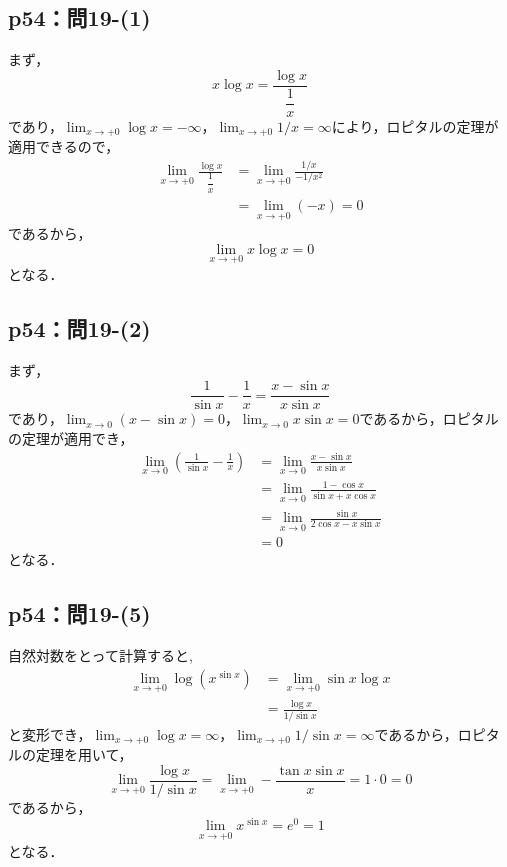 \documentclass[uplatex,dvipdfmx,a4paper,10pt,fleqn]{jsarticle}
\newenvironment{tleftbar}{\begin{tbleftline}\setlength{\parindent}{1zw}}{\end{tbleftline}}
\begin{document}
\newpage 


\subsection*{p54：問19-(1)}

\begin{tleftbar}
    まず，
    \[
        x \log x = \frac{\log x}{\dfrac{1}{x}}
    \]
    であり，$\lim_{x \to +0} \log x =-\infty$，$\lim_{x \to +0} 1/x= \infty$により，ロピタルの定理が適用できるので，
    \begin{align*} 
        \lim_{x \to +0}  \frac{\log x}{\dfrac{1}{x}} & = \lim_{x \to +0} \frac{1/x}{-1/x^2} \\
        & =\lim_{x \to +0} (-x)=0
    \end{align*}
    であるから，
    \[
        \lim_{x \to +0}   x \log x  =0
    \]
    となる．
\end{tleftbar}


\subsection*{p54：問19-(2)}

\begin{tleftbar}
    まず，
    \[
        \frac{1}{\sin x}-\frac{1}{x} = \frac{x-\sin x}{x \sin x}
    \]
    であり，$\lim_{x \to 0} (x-\sin x)=0$，$\lim_{x \to 0} x \sin x=0$であるから，ロピタルの定理が適用でき，
    \begin{align*} 
        \lim_{x \to 0} \left (\frac{1}{\sin x}-\frac{1}{x} \right ) & = \lim_{x \to 0}  \frac{x-\sin x}{x \sin x} \\
        & =  \lim_{x \to 0} \frac{1-\cos x}{\sin x + x \cos x} \\
        & = \lim_{x \to 0} \frac{\sin x}{2\cos x -x\sin x} \\
        & = 0
    \end{align*} 
    となる．
\end{tleftbar}

\subsection*{p54：問19-(5)}

\begin{tleftbar}
    自然対数をとって計算すると,
    \begin{align*} 
       \lim_{x \to +0} \log ( x^{\sin x}) & = \lim_{x \to +0} \sin x \log x \\
       & = \frac{\log x}{1/\sin x}
    \end{align*} 
    と変形でき，$\lim_{x \to +0} \log x = \infty$，$\lim_{x \to +0} 1/\sin x=\infty$であるから，ロピタルの定理を用いて，
    \[
        \lim_{x \to +0} \frac{\log x}{1/\sin x} = \lim_{x \to +0}  -\frac{\tan x \sin x }{x } = 1 \cdot 0=0
    \]
    であるから，
    \[
        \lim_{x \to +0} x^{\sin x} = e^0=1
    \]
    となる．
\end{tleftbar}
\end{document}
